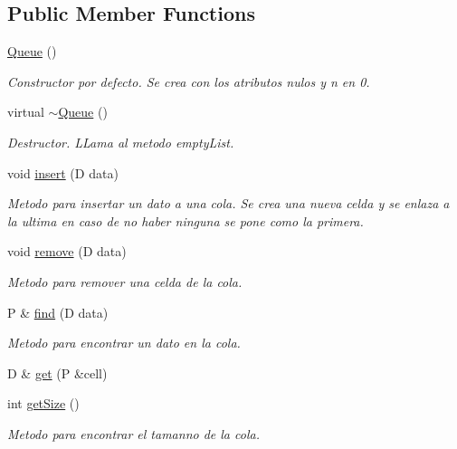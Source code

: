 \subsection*{Public Member Functions}
\begin{DoxyCompactItemize}
\item 
\hyperlink{classQueue_aaecc8eba91905e5bda9752e0f85a150e}{Queue} ()
\begin{DoxyCompactList}\small\item\em Constructor por defecto. Se crea con los atributos nulos y n en 0. \end{DoxyCompactList}\item 
virtual \hyperlink{classQueue_af88c0ebfc35932cdbbd75bae05e7a962}{$\sim$\+Queue} ()
\begin{DoxyCompactList}\small\item\em Destructor. L\+Lama al metodo empty\+List. \end{DoxyCompactList}\item 
void \hyperlink{classQueue_a63bd4d9779ddd75b2f78127337fe786a}{insert} (D data)
\begin{DoxyCompactList}\small\item\em Metodo para insertar un dato a una cola. Se crea una nueva celda y se enlaza a la ultima en caso de no haber ninguna se pone como la primera. \end{DoxyCompactList}\item 
void \hyperlink{classQueue_aa3d1a6edd30c4a9dda42e586db7f9fff}{remove} (D data)
\begin{DoxyCompactList}\small\item\em Metodo para remover una celda de la cola. \end{DoxyCompactList}\item 
P \& \hyperlink{classQueue_aefef2f172eaa0606944cdb4cf2fd5c53}{find} (D data)
\begin{DoxyCompactList}\small\item\em Metodo para encontrar un dato en la cola. \end{DoxyCompactList}\item 
D \& \hyperlink{classQueue_a1f2067f6e952bb0cec06087210b5ae2f}{get} (P \&cell)
\item 
int \hyperlink{classQueue_ab2c7217e6737bf579493b321184a2db3}{get\+Size} ()
\begin{DoxyCompactList}\small\item\em Metodo para encontrar el tamanno de la cola. \end{DoxyCompactList}\item 

\end{DoxyCompactItemize}
